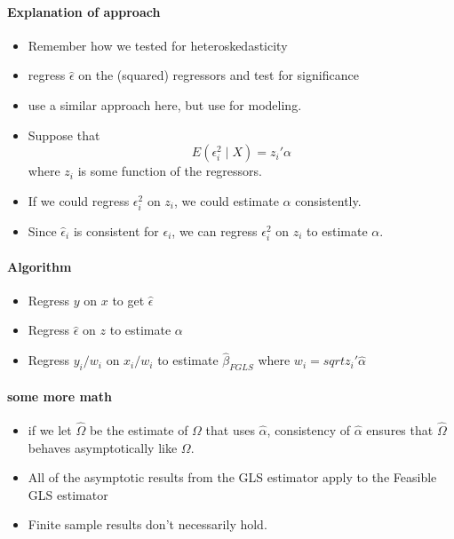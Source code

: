 \paragraph{Explanation of approach}
\begin{itemize}
\item Remember how we tested for heteroskedasticity
\item regress $\hat\epsilon$ on the (squared) regressors and test
        for significance
\item use a similar approach here, but use for modeling.
\item Suppose that
        \[ E(\epsilon_i^2 \mid X) = z_i'\alpha \]
        where $z_i$ is some function of the regressors.
\item If we could regress $\epsilon_i^2$ on $z_i$, we could estimate
        $\alpha$ consistently.
\item Since $\hat\epsilon_i$ is consistent for $\epsilon_i$, we can
        regress $\epsilon_i^2$ on $z_i$ to estimate $\alpha$.
\end{itemize}

\paragraph{Algorithm}
\begin{itemize}
\item Regress $y$ on $x$ to get $\hat\epsilon$
\item Regress $\hat \epsilon$ on $z$ to estimate $\alpha$
\item Regress $y_i/w_i$ on $x_i/w_i$ to estimate $\hat\beta_{FGLS}$
        where $w_i = sqrt{z_i'\hat\alpha}$
\end{itemize}

\paragraph{some more math}
\begin{itemize}
\item if we let $\hat\Omega$ be the estimate of $\Omega$ that uses
        $\hat\alpha$, consistency of $\hat\alpha$ ensures that
        $\hat\Omega$ behaves asymptotically like $\Omega$.
\item All of the asymptotic results from the GLS estimator apply to
        the Feasible GLS estimator
\item Finite sample results don't necessarily hold.
\end{itemize}

